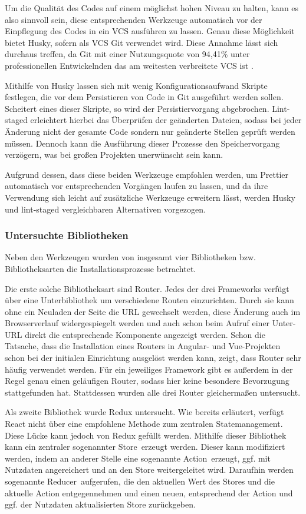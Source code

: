 Um die Qualität des Codes auf einem möglichst hohen Niveau zu halten, kann es also sinnvoll sein, diese entsprechenden Werkzeuge automatisch vor der Einpflegung des Codes in ein \gls{VCS} ausführen zu lassen. Genau diese Möglichkeit bietet Husky, sofern als \gls{VCS} Git verwendet wird. Diese Annahme lässt sich durchaus treffen, da Git mit einer Nutzungsquote von 94,41\% unter professionellen Entwickelnden das am weitesten verbreitete \gls{VCS} ist \cite{git_usage}.

Mithilfe von Husky lassen sich mit wenig Konfigurationsaufwand Skripte festlegen, die vor dem Persistieren von Code in Git ausgeführt werden sollen. Scheitert eines dieser Skripte, so wird der Persistiervorgang abgebrochen. Lint-staged erleichtert hierbei das Überprüfen der geänderten Dateien, sodass bei jeder Änderung nicht der gesamte Code sondern nur geänderte Stellen geprüft werden müssen. Dennoch kann die Ausführung dieser Prozesse den Speichervorgang verzögern, was bei großen Projekten unerwünscht sein kann.

Aufgrund dessen, dass diese beiden Werkzeuge empfohlen werden, um Prettier automatisch vor entsprechenden Vorgängen laufen zu lassen, und da ihre Verwendung sich leicht auf zusätzliche Werkzeuge erweitern lässt, werden Husky und lint-staged vergleichbaren Alternativen vorgezogen.

\subsubsection{Untersuchte Bibliotheken}
Neben den Werkzeugen wurden von insgesamt vier Bibliotheken bzw. Bibliotheksarten die Installationsprozesse betrachtet.

Die erste solche Bibliotheksart sind Router. Jedes der drei Frameworks verfügt über eine Unterbibliothek um verschiedene Routen einzurichten. Durch sie kann ohne ein Neuladen der Seite die URL gewechselt werden, diese Änderung auch im Browserverlauf widergespiegelt werden und auch schon beim Aufruf einer Unter-URL direkt die entsprechende Komponente angezeigt werden. Schon die Tatsache, dass die Installation eines Routers in Angular- und Vue-Projekten schon bei der initialen Einrichtung ausgelöst werden kann, zeigt, dass Router sehr häufig verwendet werden. Für ein jeweiliges Framework gibt es außerdem in der Regel genau einen geläufigen Router, sodass hier keine besondere Bevorzugung stattgefunden hat. Stattdessen wurden alle drei Router gleichermaßen untersucht.

Als zweite Bibliothek wurde Redux untersucht. Wie bereits erläutert, verfügt React nicht über eine empfohlene Methode zum zentralen Statemanagement. Diese Lücke kann jedoch von Redux gefüllt werden. Mithilfe dieser Bibliothek kann ein zentraler sogenannter \glqq Store\grqq\ erzeugt werden. Dieser kann modifiziert werden, indem an anderer Stelle eine sogenannte \glqq Action\grqq\ erzeugt, ggf. mit Nutzdaten angereichert und an den Store weitergeleitet wird. Daraufhin werden sogenannte \glqq Reducer\grqq\ aufgerufen, die den aktuellen Wert des Stores und die aktuelle Action entgegennehmen und einen neuen, entsprechend der Action und ggf. der Nutzdaten aktualisierten Store zurückgeben.


